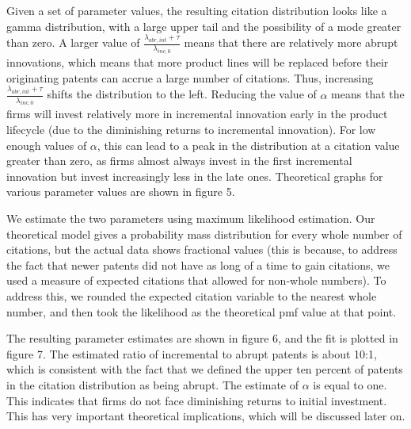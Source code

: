 \documentclass[letterpaper,12pt]{article}
\theoremstyle{definition}
\begin{document}
Given a set of parameter values, the resulting citation distribution looks like a gamma distribution, with a large upper tail and the possibility of a mode greater than zero. A larger value of $\frac{\lambda_{abr, int} + \tau}{\lambda_{inc,0}}$  means that there are relatively more abrupt innovations, which means that more product lines will be replaced before their originating patents can accrue a large number of citations. Thus, increasing $\frac{\lambda_{abr, int} + \tau}{\lambda_{inc,0}}$ shifts the distribution to the left. Reducing the value of $\alpha$ means that the firms will invest relatively more in incremental innovation early in the product lifecycle (due to the diminishing returns to incremental innovation). For low enough values of $\alpha$, this can lead to a peak in the distribution at a citation value greater than zero, as firms almost always invest in the first incremental innovation but invest increasingly less in the late ones. Theoretical graphs for various parameter values are shown in figure 5.

We estimate the two parameters using maximum likelihood estimation. Our theoretical model gives a probability mass distribution for every whole number of citations, but the actual data shows fractional values (this is because, to address the fact that newer patents did not have as long of a time to gain citations, we used a measure of expected citations that allowed for non-whole numbers). To address this, we rounded the expected citation variable to the nearest whole number, and then took the likelihood as the theoretical pmf value at that point.

The resulting parameter estimates are shown in figure 6, and the fit is plotted in figure 7.  The estimated ratio of incremental to abrupt patents is about 10:1, which is consistent with the fact that we defined the upper ten percent of patents in the citation distribution as being abrupt. The estimate of $\alpha$ is equal to one. This indicates that firms do not face diminishing returns to initial investment. This has very important theoretical implications, which will be discussed later on.
\end{document}
